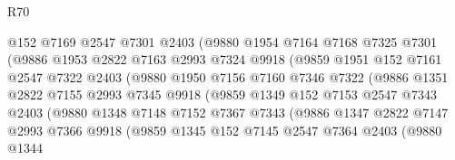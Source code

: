 \begin{lexlean}{R70}
\begin{coremodule}
                        @152
                        @7169
                        @2547
                        @7301
                        @2403
                        (@9880
                          @1954
                          @7164
                          @7168
                          @7325
                          @7301
                          (@9886
                            @1953
                            @2822
                            @7163
                            @2993
                            @7324
                            @9918
                            (@9859
                              @1951
                              @152
                              @7161
                              @2547
                              @7322
                              @2403
                              (@9880
                                @1950
                                @7156
                                @7160
                                @7346
                                @7322
                                (@9886
                                  @1351
                                  @2822
                                  @7155
                                  @2993
                                  @7345
                                  @9918
                                  (@9859
                                    @1349
                                    @152
                                    @7153
                                    @2547
                                    @7343
                                    @2403
                                    (@9880
                                      @1348
                                      @7148
                                      @7152
                                      @7367
                                      @7343
                                      (@9886
                                        @1347
                                        @2822
                                        @7147
                                        @2993
                                        @7366
                                        @9918
                                        (@9859
                                          @1345
                                          @152
                                          @7145
                                          @2547
                                          @7364
                                          @2403
                                          (@9880
                                            @1344

\end{coremodule}
\end{lexlean}
